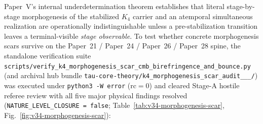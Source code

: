 \documentclass[11pt,a4paper]{article}
\begin{document}
Paper~V's internal underdetermination theorem establishes that literal stage-by-stage morphogenesis of the stabilized $K_4$ carrier and an atemporal simultaneous realization are operationally indistinguishable unless a pre-stabilization transition leaves a terminal-visible \emph{stage observable}. To test whether concrete morphogenesis scars survive on the Paper~21 / Paper~24 / Paper~26 / Paper~28 spine, the standalone verification suite \texttt{scripts/\allowbreak verify\_\allowbreak k4\_\allowbreak morphogenesis\_\allowbreak scar\_\allowbreak cmb\_\allowbreak birefringence\_\allowbreak and\_\allowbreak bounce.py} (and archival hub bundle \texttt{tau-core-theory/\allowbreak k4\_\allowbreak morphogenesis\_\allowbreak scar\_\allowbreak audit\_\_\_/}) was executed under \texttt{python3 -W error} ($\mathrm{rc}=0$) and cleared Stage-A hostile referee review with all five major physical findings resolved (\texttt{NATURE\_\allowbreak LEVEL\_\allowbreak CLOSURE = false}; Table~\ref{tab:v34-morphogenesis-scar}, Fig.~\ref{fig:v34-morphogenesis-scar}):
\end{document}
